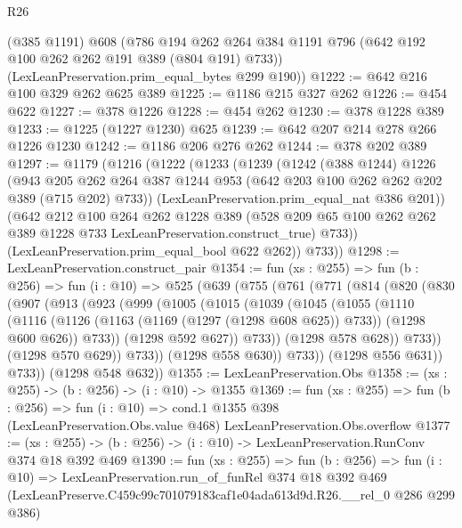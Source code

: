 \begin{lexlean}{R26}
\begin{coremodule}
      (@385 @1191)
      @608
      (@786 @194 @262 @264 @384 @1191 @796 (@642 @192 @100 @262 @262 @191 @389 (@804 @191) @733))
      (LexLeanPreservation.prim_equal_bytes @299 @190))
@1222 := @642 @216 @100 @329 @262 @625 @389
@1225 := @1186 @215 @327 @262
@1226 := @454 @622
@1227 := @378 @1226
@1228 := @454 @262
@1230 := @378 @1228 @389
@1233 := @1225 (@1227 @1230) @625
@1239 := @642 @207 @214 @278 @266 @1226 @1230
@1242 := @1186 @206 @276 @262
@1244 := @378 @202 @389
@1297 := @1179
    (@1216
      (@1222
        (@1233
          (@1239
            (@1242
              (@388 @1244)
              @1226
              (@943
                @205
                @262
                @264
                @387
                @1244
                @953
                (@642 @203 @100 @262 @262 @202 @389 (@715 @202) @733))
              (LexLeanPreservation.prim_equal_nat @386 @201))
            (@642
              @212
              @100
              @264
              @262
              @1228
              @389
              (@528 @209 @65 @100 @262 @262 @389 @1228 @733 LexLeanPreservation.construct_true)
              @733))
          (LexLeanPreservation.prim_equal_bool @622 @262))
        @733))
@1298 := LexLeanPreservation.construct_pair
@1354 := fun (xs : @255) =>
  fun (b : @256) =>
  fun (i : @10) =>
  @525
    (@639
      (@755
        (@761
          (@771
            (@814
              (@820
                (@830
                  (@907
                    (@913
                      (@923
                        (@999
                          (@1005
                            (@1015
                              (@1039
                                (@1045
                                  (@1055
                                    (@1110
                                      (@1116
                                        (@1126
                                          (@1163 (@1169 (@1297 (@1298 @608 @625)) @733))
                                          (@1298 @600 @626))
                                        @733))
                                    (@1298 @592 @627))
                                  @733))
                              (@1298 @578 @628))
                            @733))
                        (@1298 @570 @629))
                      @733))
                  (@1298 @558 @630))
                @733))
            (@1298 @556 @631))
          @733))
      (@1298 @548 @632))
@1355 := LexLeanPreservation.Obs
@1358 := (xs : @255) -> (b : @256) -> (i : @10) -> @1355
@1369 := fun (xs : @255) =>
  fun (b : @256) =>
  fun (i : @10) =>
  cond.{1} @1355 @398 (LexLeanPreservation.Obs.value @468) LexLeanPreservation.Obs.overflow
@1377 := (xs : @255) -> (b : @256) -> (i : @10) -> LexLeanPreservation.RunConv @374 @18 @392 @469
@1390 := fun (xs : @255) =>
  fun (b : @256) =>
  fun (i : @10) =>
  LexLeanPreservation.run_of_funRel
    @374
    @18
    @392
    @469
    (LexLeanPreserve.C459c99c701079183caf1e04ada613d9d.R26.__rel_0 @286 @299 @386)
\end{coremodule}
\end{lexlean}
